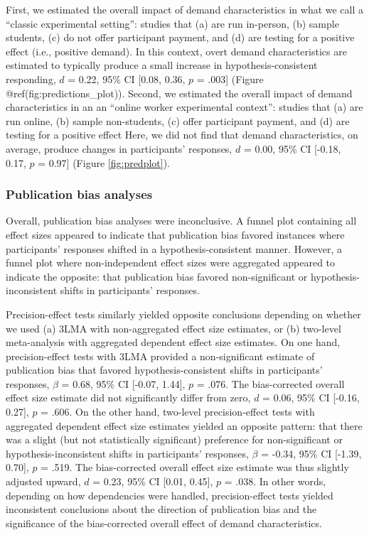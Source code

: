 \documentclass[
  man,floatsintext]{apa6}
\begin{document}
First, we estimated the overall impact of demand characteristics in what we call a ``classic experimental setting'': studies that (a) are run in-person, (b) sample students, (c) do not offer participant payment, and (d) are testing for a positive effect (i.e., positive demand). In this context, overt demand characteristics are estimated to typically produce a small increase in hypothesis-consistent responding, \(d\) = 0.22, 95\% CI {[}0.08, 0.36, \(p\) = .003{]} (Figure @ref(fig:predictions\_plot)). Second, we estimated the overall impact of demand characteristics in an an ``online worker experimental context'': studies that (a) are run online, (b) sample non-students, (c) offer participant payment, and (d) are testing for a positive effect Here, we did not find that demand characteristics, on average, produce changes in participants' responses, \(d\) = 0.00, 95\% CI {[}-0.18, 0.17, \(p\) = 0.97{]} (Figure \ref{fig:predplot}).

\hypertarget{publication-bias-analyses-1}{%
\subsubsection{Publication bias analyses}\label{publication-bias-analyses-1}}

Overall, publication bias analyses were inconclusive. A funnel plot containing all effect sizes appeared to indicate that publication bias favored instances where participants' responses shifted in a hypothesis-consistent manner. However, a funnel plot where non-independent effect sizes were aggregated appeared to indicate the opposite: that publication bias favored non-significant or hypothesis-inconsistent shifts in participants' responses.

Precision-effect tests similarly yielded opposite conclusions depending on whether we used (a) 3LMA with non-aggregated effect size estimates, or (b) two-level meta-analysis with aggregated dependent effect size estimates. On one hand, precision-effect tests with 3LMA provided a non-significant estimate of publication bias that favored hypothesis-consistent shifts in participants' responses, \(\beta\) = 0.68, 95\% CI {[}-0.07, 1.44{]}, \(p\) = .076. The bias-corrected overall effect size estimate did not significantly differ from zero, \(d\) = 0.06, 95\% CI {[}-0.16, 0.27{]}, \(p\) = .606. On the other hand, two-level precision-effect tests with aggregated dependent effect size estimates yielded an opposite pattern: that there was a slight (but not statistically significant) preference for non-significant or hypothesis-inconsistent shifts in participants' responses, \(\beta\) = -0.34, 95\% CI {[}-1.39, 0.70{]}, \(p\) = .519. The bias-corrected overall effect size estimate was thus slightly adjusted upward, \(d\) = 0.23, 95\% CI {[}0.01, 0.45{]}, \(p\) = .038. In other words, depending on how dependencies were handled, precision-effect tests yielded inconsistent conclusions about the direction of publication bias and the significance of the bias-corrected overall effect of demand characteristics.
\end{document}
